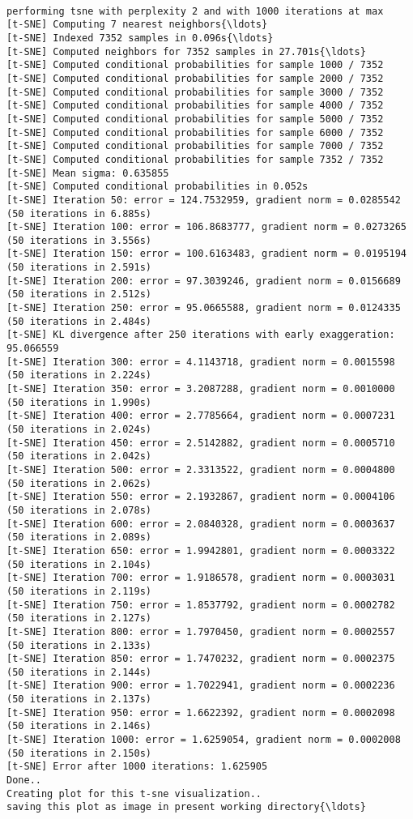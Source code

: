 \documentclass[11pt]{article}
\begin{document}
    \begin{Verbatim}[commandchars=\\\{\}]

performing tsne with perplexity 2 and with 1000 iterations at max
[t-SNE] Computing 7 nearest neighbors{\ldots}
[t-SNE] Indexed 7352 samples in 0.096s{\ldots}
[t-SNE] Computed neighbors for 7352 samples in 27.701s{\ldots}
[t-SNE] Computed conditional probabilities for sample 1000 / 7352
[t-SNE] Computed conditional probabilities for sample 2000 / 7352
[t-SNE] Computed conditional probabilities for sample 3000 / 7352
[t-SNE] Computed conditional probabilities for sample 4000 / 7352
[t-SNE] Computed conditional probabilities for sample 5000 / 7352
[t-SNE] Computed conditional probabilities for sample 6000 / 7352
[t-SNE] Computed conditional probabilities for sample 7000 / 7352
[t-SNE] Computed conditional probabilities for sample 7352 / 7352
[t-SNE] Mean sigma: 0.635855
[t-SNE] Computed conditional probabilities in 0.052s
[t-SNE] Iteration 50: error = 124.7532959, gradient norm = 0.0285542 (50 iterations in 6.885s)
[t-SNE] Iteration 100: error = 106.8683777, gradient norm = 0.0273265 (50 iterations in 3.556s)
[t-SNE] Iteration 150: error = 100.6163483, gradient norm = 0.0195194 (50 iterations in 2.591s)
[t-SNE] Iteration 200: error = 97.3039246, gradient norm = 0.0156689 (50 iterations in 2.512s)
[t-SNE] Iteration 250: error = 95.0665588, gradient norm = 0.0124335 (50 iterations in 2.484s)
[t-SNE] KL divergence after 250 iterations with early exaggeration: 95.066559
[t-SNE] Iteration 300: error = 4.1143718, gradient norm = 0.0015598 (50 iterations in 2.224s)
[t-SNE] Iteration 350: error = 3.2087288, gradient norm = 0.0010000 (50 iterations in 1.990s)
[t-SNE] Iteration 400: error = 2.7785664, gradient norm = 0.0007231 (50 iterations in 2.024s)
[t-SNE] Iteration 450: error = 2.5142882, gradient norm = 0.0005710 (50 iterations in 2.042s)
[t-SNE] Iteration 500: error = 2.3313522, gradient norm = 0.0004800 (50 iterations in 2.062s)
[t-SNE] Iteration 550: error = 2.1932867, gradient norm = 0.0004106 (50 iterations in 2.078s)
[t-SNE] Iteration 600: error = 2.0840328, gradient norm = 0.0003637 (50 iterations in 2.089s)
[t-SNE] Iteration 650: error = 1.9942801, gradient norm = 0.0003322 (50 iterations in 2.104s)
[t-SNE] Iteration 700: error = 1.9186578, gradient norm = 0.0003031 (50 iterations in 2.119s)
[t-SNE] Iteration 750: error = 1.8537792, gradient norm = 0.0002782 (50 iterations in 2.127s)
[t-SNE] Iteration 800: error = 1.7970450, gradient norm = 0.0002557 (50 iterations in 2.133s)
[t-SNE] Iteration 850: error = 1.7470232, gradient norm = 0.0002375 (50 iterations in 2.144s)
[t-SNE] Iteration 900: error = 1.7022941, gradient norm = 0.0002236 (50 iterations in 2.137s)
[t-SNE] Iteration 950: error = 1.6622392, gradient norm = 0.0002098 (50 iterations in 2.146s)
[t-SNE] Iteration 1000: error = 1.6259054, gradient norm = 0.0002008 (50 iterations in 2.150s)
[t-SNE] Error after 1000 iterations: 1.625905
Done..
Creating plot for this t-sne visualization..
saving this plot as image in present working directory{\ldots}

    \end{Verbatim}
\end{document}
